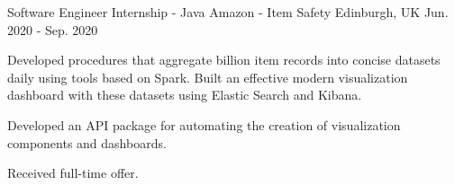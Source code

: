 \begin{cventries}
  \cventry
    {Software Engineer Internship - Java} %
    {Amazon - Item Safety} %
    {Edinburgh, UK} %
    {Jun. 2020 - Sep. 2020} %
    {
      \begin{cvitems} %
        \item {Developed procedures that aggregate  billion item records into concise datasets daily using tools based on Spark. Built an effective modern visualization dashboard with these datasets using Elastic Search and Kibana.}
        \item {Developed an API package for automating the creation of visualization components and dashboards.}
        \item {Received full-time offer.}
      \end{cvitems}
    }


\end{cventries}
